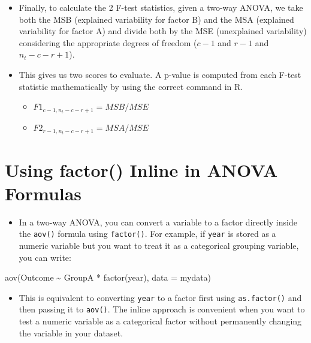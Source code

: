 \documentclass[
  letterpaper,
  DIV=11,
  numbers=noendperiod]{scrreprt}
\newenvironment{Shaded}{\begin{snugshade}}{\end{snugshade}}
\newcommand{\AttributeTok}[1]{\textcolor[rgb]{0.40,0.45,0.13}{#1}}
\newcommand{\FunctionTok}[1]{\textcolor[rgb]{0.28,0.35,0.67}{#1}}
\newcommand{\NormalTok}[1]{\textcolor[rgb]{0.00,0.23,0.31}{#1}}
\newcommand{\SpecialCharTok}[1]{\textcolor[rgb]{0.37,0.37,0.37}{#1}}
\providecommand{\tightlist}{%
  \setlength{\itemsep}{0pt}\setlength{\parskip}{0pt}}\usepackage{longtable,booktabs,array}
\begin{document}
\begin{itemize}
\tightlist
\item
  Finally, to calculate the 2 F-test statistics, given a two-way ANOVA,
  we take both the MSB (explained variability for factor B) and the MSA
  (explained variability for factor A) and divide both by the MSE
  (unexplained variability) considering the appropriate degrees of
  freedom (\(c-1\) and \(r-1\) and \(n_t-c-r+1\)).
\item
  This gives us two scores to evaluate. A p-value is computed from each
  F-test statistic mathematically by using the correct command in R.

  \begin{itemize}
  \tightlist
  \item
    \(F1_{c-1,n_t-c-r+1 }= MSB/MSE\)
  \item
    \(F2_{r-1,n_t-c-r+1 }= MSA/MSE\)
  \end{itemize}
\end{itemize}

\section{Using factor() Inline in ANOVA
Formulas}\label{using-factor-inline-in-anova-formulas}

\begin{itemize}
\tightlist
\item
  In a two-way ANOVA, you can convert a variable to a factor directly
  inside the \texttt{aov()} formula using \texttt{factor()}. For
  example, if \texttt{year} is stored as a numeric variable but you want
  to treat it as a categorical grouping variable, you can write:
\end{itemize}

\begin{Shaded}
\begin{Highlighting}[]
\FunctionTok{aov}\NormalTok{(Outcome }\SpecialCharTok{\textasciitilde{}}\NormalTok{ GroupA }\SpecialCharTok{*} \FunctionTok{factor}\NormalTok{(year), }\AttributeTok{data =}\NormalTok{ mydata)}
\end{Highlighting}
\end{Shaded}

\begin{itemize}
\tightlist
\item
  This is equivalent to converting \texttt{year} to a factor first using
  \texttt{as.factor()} and then passing it to \texttt{aov()}. The inline
  approach is convenient when you want to test a numeric variable as a
  categorical factor without permanently changing the variable in your
  dataset.
\end{itemize}
\end{document}
